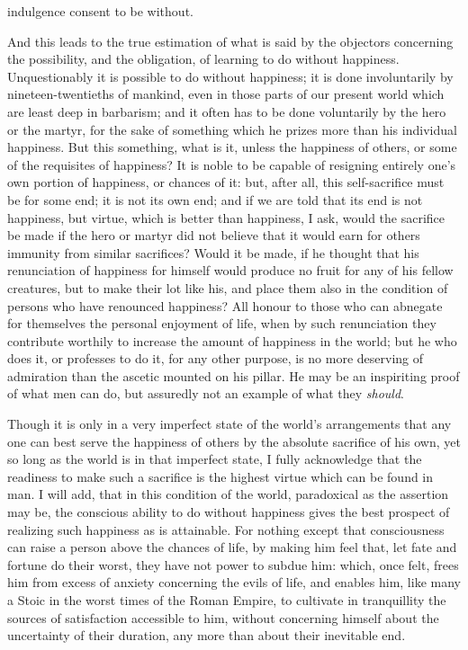 \documentclass[12pt]{report}
\begin{document}
indulgence consent to be without.

And this leads to the true estimation of what is said by the objectors concerning the possibility, and the obligation, of learning to do without happiness. Unquestionably it is possible to do without happiness; it is done involuntarily by nineteen-twentieths of mankind, even in those parts of our present world which are least deep in barbarism; and it often has to be done voluntarily by the hero or the martyr, for the sake of something which he prizes more than his individual happiness. But this something, what is it, unless the happiness of others, or some of the requisites of happiness? It is noble to be capable of resigning entirely one's own portion of happiness, or chances of it: but, after all, this self-sacrifice must be for some end; it is not its own end; and if we are told that its end is not happiness, but virtue, which is better than happiness, I ask, would the sacrifice be made if the hero or martyr did not believe that it would earn for others immunity from similar sacrifices? Would it be made, if he thought that his renunciation of happiness for himself would produce no fruit for any of his fellow creatures, but to make their lot like his, and place them also in the condition of persons who have renounced happiness? All honour to those who can abnegate for themselves the personal enjoyment of life, when by such renunciation they contribute worthily to increase the amount of happiness in the world; but he who does it, or professes to do it, for any other purpose, is no more deserving of admiration than the ascetic mounted on his pillar. He may be an inspiriting proof of what men can do, but assuredly not an example of what they \emph{should}.

Though it is only in a very imperfect state of the world's arrangements that any one can best serve the happiness of others by the absolute sacrifice of his own, yet so long as the world is in that imperfect state, I fully acknowledge that the readiness to make such a sacrifice is the highest virtue which can be found in man. I will add, that in this condition of the world, paradoxical as the assertion may be, the conscious ability to do without happiness gives the best prospect of realizing such happiness as is attainable. For nothing except that consciousness can raise a person above the chances of life, by making him feel that, let fate and fortune do their worst, they have not power to subdue him: which, once felt, frees him from excess of anxiety concerning the evils of life, and enables him, like many a Stoic in the worst times of the Roman Empire, to cultivate in tranquillity the sources of satisfaction accessible to him, without concerning himself about the uncertainty of their duration, any more than about their inevitable end.
\end{document}
